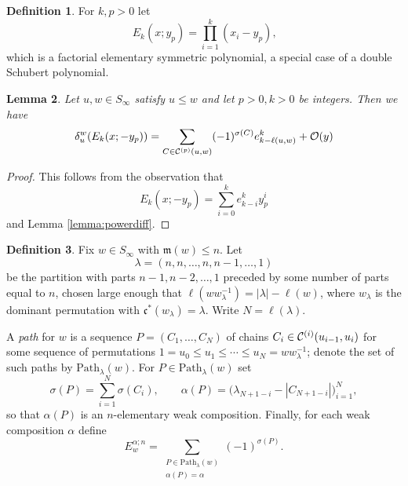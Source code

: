 \documentclass{amsart}
\newtheorem{lemma}{Lemma}[subsection]
\theoremstyle{definition}
\newtheorem{definition}[lemma]{Definition}
\theoremstyle{remark}
\numberwithin{equation}{subsection}
\newcommand{\code}{\mathfrak{c}}
\newcommand{\maxd}{\mathfrak{m}}
\begin{document}
\begin{definition}
For $k,p>0$ let 
$$E_k(x;y_p)=\prod_{i=1}^k (x_i - y_p)\text{,}$$
which is a factorial elementary symmetric polynomial, a special case of a double Schubert polynomial.
\end{definition}

\begin{lemma} \label{lemma:doublediff}
  Let $u,w\in S_\infty$ satisfy $u\leq w$ and let $p>0,k>0$ be integers. Then we have
  $$\delta_u^w(E_k(x;-y_p))=\sum_{C\in\mathcal{C}^{(p)}(u,w)}(-1)^{\sigma(C)}e_{k-\ell(u,w)}^k+\mathcal{O}(y)$$
\end{lemma}

\begin{proof}
This follows from the observation that
$$E_k(x;-y_p) = \sum_{i=0}^k e_{k-i}^k y_p^i$$
and Lemma \ref{lemma:powerdiff}.
\end{proof}

\begin{definition}\label{definition:elemcoeff}
Fix $w\in S_\infty$ with $\maxd(w)\leq n$. Let
$$\lambda = (n, n, \ldots, n, n - 1,\ldots, 1)$$
be the partition with parts $n-1,n-2,\ldots,1$ preceded by some number of parts equal to $n$, chosen large enough that $\ell(ww_\lambda^{-1})=|\lambda|-\ell(w)$, where $w_\lambda$ is the dominant permutation with $\code^*(w_\lambda)=\lambda$. Write $N=\ell(\lambda)$.

A \emph{path} for $w$ is a sequence $P=(C_1,\ldots,C_N)$ of chains $C_i\in\mathcal{C}^{(i)}(u_{i-1},u_i)$ for some sequence of permutations $1=u_0\leq u_1\leq\cdots\leq u_N=ww_\lambda^{-1}$; denote the set of such paths by $\mathrm{Path}_\lambda(w)$. For $P\in\mathrm{Path}_\lambda(w)$ set
$$\sigma(P) = \sum_{i=1}^{N} \sigma(C_i),\qquad \alpha(P) = \bigl(\lambda_{N + 1 - i}-|C_{N + 1 - i}|\bigr)_{i=1}^{N},$$
so that $\alpha(P)$ is an $n$-elementary weak composition. Finally, for each weak composition $\alpha$ define
$$E^{\alpha;n}_w = \sum_{\substack{P \in \mathrm{Path}_\lambda(w)\\ \alpha(P)=\alpha}}(-1)^{\sigma(P)}.$$
\end{definition}
\end{document}
